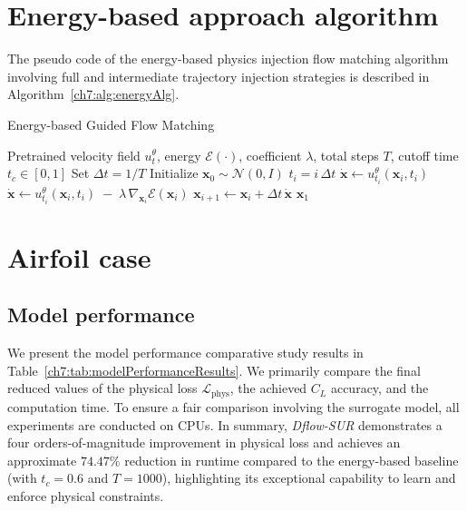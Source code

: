 \section{Energy-based approach algorithm}
\label{ch7:sect:App_energyBasedAlg}

The pseudo code of the energy-based physics injection flow matching algorithm involving full and intermediate trajectory injection strategies is described in Algorithm~\ref{ch7:alg:energyAlg}.

\begin{algorithm}[H]
\caption{Energy-based Guided Flow Matching}
\begin{algorithmic}[1]
\Require Pretrained velocity field $u_t^\theta$, energy $\mathcal{E}(\cdot)$, coefficient $\lambda$, total steps $T$, cutoff time $t_c\in[0,1]$
\State Set $\Delta t = 1/T$
\State Initialize $\mathbf{x}_0 \sim \mathcal{N}(0,I)$
    \State $t_i = i\,\Delta t$
        \State $\dot{\mathbf{x}} \leftarrow u_{t_i}^\theta(\mathbf{x}_i, t_i)$
    \Else
        \State $\dot{\mathbf{x}} \leftarrow u_{t_i}^\theta(\mathbf{x}_i, t_i)\;-\;\lambda\,\nabla_{\mathbf{x}_i}\mathcal{E}(\mathbf{x}_i)$
    \EndIf
    \State $\mathbf{x}_{i+1} \leftarrow \mathbf{x}_i + \Delta t\,\dot{\mathbf{x}}$
\EndFor
\State \Return $\mathbf{x}_1$
\end{algorithmic}
\label{ch7:alg:energyAlg}
\end{algorithm}


\section{Airfoil case}
\subsection{Model performance}
\label{ch7:subsect:modelPerformance}
We present the model performance comparative study results in Table~\ref{ch7:tab:modelPerformanceResults}. We primarily compare the final reduced values of the physical loss $\mathcal{L}_{\mathrm{phys}}$, the achieved $C_{L}$ accuracy, and the computation time. To ensure a fair comparison involving the surrogate model, all experiments are conducted on CPUs. In summary, \textit{Dflow-SUR} demonstrates a four orders-of-magnitude improvement in physical loss and achieves an approximate $74.47\%$ reduction in runtime compared to the energy-based baseline (with $t_c = 0.6$ and $T = 1000$), highlighting its exceptional capability to learn and enforce physical constraints.

